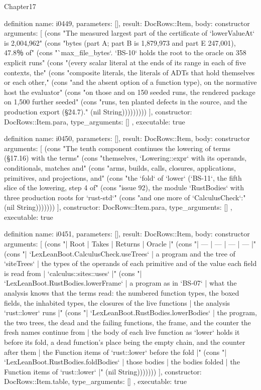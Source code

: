 \begin{lexlean}{Chapter17}
\begin{semanticmodule}
definition{
  name: i0449,
  parameters: [],
  result: DocRows::Item,
  body: constructor{
    arguments: [
      (cons "The measured largest part of the certificate of `lowerValueAt` is 2,004,962" (cons "bytes (part A; part B is 1,879,973 and part E 247,001), 47.8％ of" (cons "`max_file_bytes`. `BS-10` holds the root to the oracle on 358 explicit runs" (cons "(every scalar literal at the ends of its range in each of five contexts, the" (cons "composite literals, the literals of ADTs that hold themselves or each other," (cons "and the absent option of a function type), on the normative host the evaluator" (cons "on those and on 150 seeded runs, the rendered package on 1,500 further seeded" (cons "runs, ten planted defects in the source, and the production export (§24.7)." (nil String)))))))))
    ],
    constructor: DocRows::Item.para,
    type_arguments: []
  },
  executable: true
}

definition{
  name: i0450,
  parameters: [],
  result: DocRows::Item,
  body: constructor{
    arguments: [
      (cons "The tenth component continues the lowering of terms (§17.16) with the terms" (cons "themselves, `Lowering::expr` with its operands, conditionals, matches and" (cons "arms, builds, calls, closures, applications, primitives, and projections, and" (cons "the `fold` of `lower` (`BS-11`, the fifth slice of the lowering, step 4 of" (cons "issue 92), the module `RustBodies` with three production roots for `rust-std`" (cons "and one more of `CalculusCheck`:" (nil String)))))))
    ],
    constructor: DocRows::Item.para,
    type_arguments: []
  },
  executable: true
}

definition{
  name: i0451,
  parameters: [],
  result: DocRows::Item,
  body: constructor{
    arguments: [
      (cons "| Root | Takes | Returns | Oracle |" (cons "| --- | --- | --- | --- |" (cons "| `LexLeanBoot.CalculusCheck.useTrees` | a program and the tree of `siteTrees` | the types of the operands of each primitive and of the value each field is read from | `calculus::sites::uses` |" (cons "| `LexLeanBoot.RustBodies.lowerFrame` | a program as in `BS-07` | what the analysis knows that the terms read: the numbered function types, the boxed fields, the inhabited types, the closures of the live functions | the analysis `rust::lower` runs |" (cons "| `LexLeanBoot.RustBodies.lowerBodies` | the program, the two trees, the dead and the failing functions, the frame, and the counter the fresh names continue from | the body of each live function as `lower` holds it before its fold, a dead function's place being the empty chain, and the counter after them | the Function items of `rust::lower` before the fold |" (cons "| `LexLeanBoot.RustBodies.foldBodies` | those bodies | the bodies folded | the Function items of `rust::lower` |" (nil String)))))))
    ],
    constructor: DocRows::Item.table,
    type_arguments: []
  },
  executable: true
}


\end{semanticmodule}
\end{lexlean}
